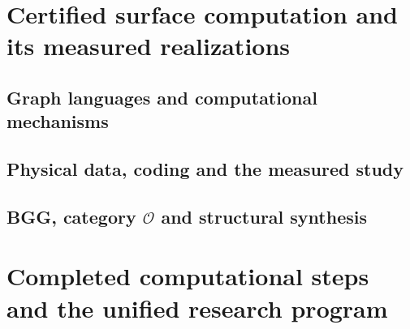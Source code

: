 \documentclass[11pt,oneside,openany]{book}
\theoremstyle{definition}
\theoremstyle{remark}
\begin{document}
\part{Certified surface computation and its measured realizations}





\chapter{Graph languages and computational mechanisms}

\chapter{Physical data, coding and the measured study}



\chapter{BGG, category \texorpdfstring{$\mathcal O$}{O} and structural synthesis}



\part{Completed computational steps and the unified research program}



\appendix





\begingroup\footnotesize\raggedright


\endgroup


\backmatter


\end{document}
